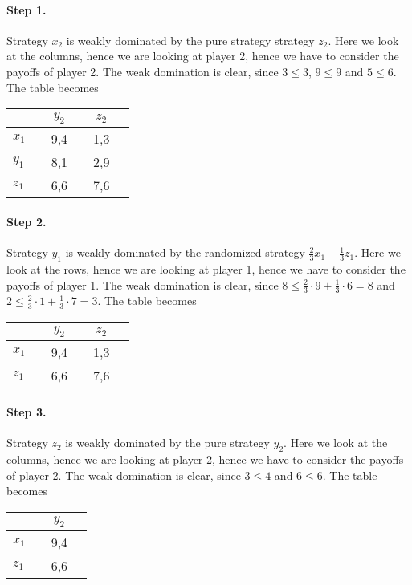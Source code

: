 \paragraph{Step 1.} Strategy $x_{2}$ is weakly dominated by the pure strategy strategy $z_{2}$. Here we look at the columns, hence we are looking at player 2, hence we have to consider the payoffs of player 2. The weak domination is clear, since $3 \leq 3$, $9 \leq 9$ and $5 \leq 6$. The table becomes

\begin{tabular}[h!]{l|ccccc}
		&& $y_2$ && $z_2$ \\
		\hline
		$x_1$ && 9,4 && 1,3 & \\
		$y_1$ && 8,1 && 2,9 & \\
		$z_1$ && 6,6 && 7,6 &
	\end{tabular} 
	
	\paragraph{Step 2.} Strategy $y_{1}$ is weakly dominated by the randomized strategy $\frac{2}{3} x_{1} + \frac{1}{3} z_{1}$. Here we look at the rows, hence we are looking at player 1, hence we have to consider the payoffs of player 1. The weak domination is clear, since $8 \leq \frac{2}{3} \cdot 9 + \frac{1}{3} \cdot 6 = 8$ and $2 \leq \frac{2}{3} \cdot 1 + \frac{1}{3} \cdot 7 = 3$. The table becomes

\begin{tabular}[h!]{l|ccccc}
		&& $y_2$ && $z_2$ \\
		\hline
		$x_1$ && 9,4 && 1,3 & \\
		$z_1$ && 6,6 && 7,6 &
	\end{tabular} 
	
\paragraph{Step 3.} Strategy $z_{2}$ is weakly dominated by the pure strategy $y_{2}$. Here we look at the columns, hence we are looking at player 2, hence we have to consider the payoffs of player 2. The weak domination is clear, since $3 \leq 4$ and $6 \leq 6$. The table becomes

\begin{tabular}[h!]{l|ccc}
		&& $y_2$ \\
		\hline
		$x_1$ && 9,4 & \\
		$z_1$ && 6,6 &
	\end{tabular} 

